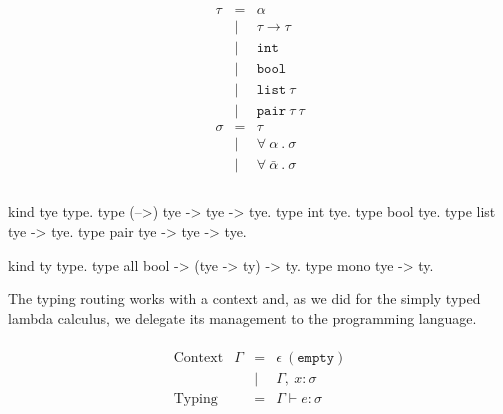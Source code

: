 \documentclass[a4paper, 11pt]{book}
\begin{document}
\begin{center}
\begin{minipage}{0.4\textwidth}
$$
\begin{array}{lrl}
  \\
    \tau   &=     & \alpha                    \\
                              &\vert &  \tau \to \tau         \\
                              &\vert &  \mathtt{int}         \\
                              &\vert &  \mathtt{bool}         \\
                              &\vert &  \mathtt{list}\ \tau         \\
                              &\vert &  \mathtt{pair}\ \tau\ \tau         \\
  
     \sigma &=    & \tau                                           \\
                             &\vert& \forall\ \alpha\ .\ \sigma \\
                            &\vert& \forall\ \bar\alpha\ .\ \sigma \\
  \\
\end{array}
$$
\end{minipage}
\begin{minipage}{0.5\textwidth}
\begin{elpicodelj}
kind tye type.
type (-->) tye -> tye -> tye.  
type int   tye.
type bool  tye.
type list  tye -> tye.
type pair  tye -> tye -> tye.

kind ty type.
type all    bool -> (tye -> ty) -> ty.
type mono   tye -> ty.
\end{elpicodelj}
\end{minipage}
\end{center}


The typing routing works with a context and, as we did for the
simply typed lambda calculus, we delegate its management to the
programming language.

$$
\begin{array}{llrl}
  \\
    \text{Context}     & \Gamma & = & \epsilon\ \mathtt{(empty)}\\
                       &        & \vert& \Gamma,\ x : \sigma\\
    \text{Typing}      &        & = & \Gamma \vdash e : \sigma\\
  \\
  \end{array}
$$
\end{document}
